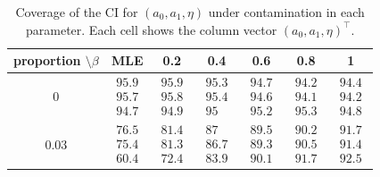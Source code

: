 \documentclass{article}
\begin{document}
\begin{table}[htbp]
\centering
\caption{Coverage of the CI for $(a_0,a_1,\eta)$ under contamination in each parameter. Each cell shows the column vector $\left( a_0 ,a_1 , \eta \right)^{\intercal}$.}
\label{tab:table_CI_parameters}
\renewcommand{\arraystretch}{1.15} %
\small

\begin{tabular}{ccccccc}
\hline
proportion $\setminus \beta$ 
& MLE & 0.2 & 0.4 & 0.6 & 0.8 & 1 \\ 
\hline

0 &
$\begin{matrix}95.9\\95.7\\94.7\end{matrix}$ &
$\begin{matrix}95.9\\95.8\\94.9\end{matrix}$ &
$\begin{matrix}95.3\\95.4\\95\end{matrix}$ &
$\begin{matrix}94.7\\94.6\\95.2\end{matrix}$ &
$\begin{matrix}94.2\\94.1\\95.3\end{matrix}$ &
$\begin{matrix}94.4\\94.2\\94.8\end{matrix}$
\\[3pt]\hline

0.03 &
$\begin{matrix}76.5\\75.4\\60.4\end{matrix}$ &
$\begin{matrix}81.4\\81.3\\72.4\end{matrix}$ &
$\begin{matrix}87\\86.7\\83.9\end{matrix}$ &
$\begin{matrix}89.5\\89.3\\90.1\end{matrix}$ &
$\begin{matrix}90.2\\90.5\\91.7\end{matrix}$ &
$\begin{matrix}91.7\\91.4\\92.5\end{matrix}$
\\[3pt]\hline


\end{tabular}
\end{table}
\end{document}
